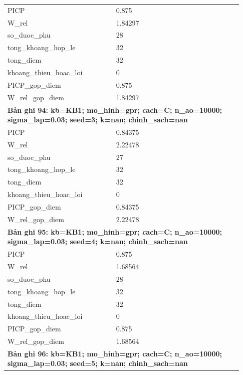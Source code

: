 \begin{longtable}{p{0.43\linewidth}p{0.50\linewidth}}
PICP & 0.875 \\
W\_\allowbreak rel & 1.84297 \\
so\_\allowbreak duoc\_\allowbreak phu & 28 \\
tong\_\allowbreak khoang\_\allowbreak hop\_\allowbreak le & 32 \\
tong\_\allowbreak diem & 32 \\
khoang\_\allowbreak thieu\_\allowbreak hoac\_\allowbreak loi & 0 \\
PICP\_\allowbreak gop\_\allowbreak diem & 0.875 \\
W\_\allowbreak rel\_\allowbreak gop\_\allowbreak diem & 1.84297 \\
\midrule
\multicolumn{2}{p{0.95\linewidth}}{\textbf{Bản ghi 94: kb=KB1; mo\_hinh=gpr; cach=C; n\_ao=10000; sigma\_lap=0.03; seed=3; k=nan; chinh\_sach=nan}} \\
PICP & 0.84375 \\
W\_\allowbreak rel & 2.22478 \\
so\_\allowbreak duoc\_\allowbreak phu & 27 \\
tong\_\allowbreak khoang\_\allowbreak hop\_\allowbreak le & 32 \\
tong\_\allowbreak diem & 32 \\
khoang\_\allowbreak thieu\_\allowbreak hoac\_\allowbreak loi & 0 \\
PICP\_\allowbreak gop\_\allowbreak diem & 0.84375 \\
W\_\allowbreak rel\_\allowbreak gop\_\allowbreak diem & 2.22478 \\
\midrule
\multicolumn{2}{p{0.95\linewidth}}{\textbf{Bản ghi 95: kb=KB1; mo\_hinh=gpr; cach=C; n\_ao=10000; sigma\_lap=0.03; seed=4; k=nan; chinh\_sach=nan}} \\
PICP & 0.875 \\
W\_\allowbreak rel & 1.68564 \\
so\_\allowbreak duoc\_\allowbreak phu & 28 \\
tong\_\allowbreak khoang\_\allowbreak hop\_\allowbreak le & 32 \\
tong\_\allowbreak diem & 32 \\
khoang\_\allowbreak thieu\_\allowbreak hoac\_\allowbreak loi & 0 \\
PICP\_\allowbreak gop\_\allowbreak diem & 0.875 \\
W\_\allowbreak rel\_\allowbreak gop\_\allowbreak diem & 1.68564 \\
\midrule
\multicolumn{2}{p{0.95\linewidth}}{\textbf{Bản ghi 96: kb=KB1; mo\_hinh=gpr; cach=C; n\_ao=10000; sigma\_lap=0.03; seed=5; k=nan; chinh\_sach=nan}} \\

\end{longtable}
